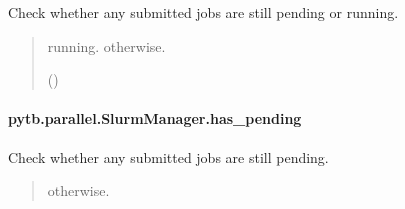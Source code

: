 \documentclass[letterpaper,10pt,english,openany,oneside]{sphinxmanual}
\begin{document}
\begin{fulllineitems}
\begin{fulllineitems}
\label{\detokenize{api/pytb.parallel.SlurmManager.has_active:pytb.parallel.SlurmManager.has_active}}
\pysigstartsignatures
{}
\pysigstopsignatures
\sphinxAtStartPar
Check whether any submitted jobs are still pending or running.
\begin{quote}\begin{description}
\sphinxAtStartPar
\begin{description}
\sphinxAtStartPar
running.  otherwise.

\end{description}


\sphinxAtStartPar
()

\end{description}\end{quote}

\end{fulllineitems}


\sphinxstepscope


\paragraph{pytb.parallel.SlurmManager.has\_pending}
\label{\detokenize{api/pytb.parallel.SlurmManager.has_pending:pytb-parallel-slurmmanager-has-pending}}\label{\detokenize{api/pytb.parallel.SlurmManager.has_pending::doc}}

\begin{fulllineitems}
\label{\detokenize{api/pytb.parallel.SlurmManager.has_pending:pytb.parallel.SlurmManager.has_pending}}
\pysigstartsignatures
{}
\pysigstopsignatures
\sphinxAtStartPar
Check whether any submitted jobs are still pending.
\begin{quote}\begin{description}
\sphinxAtStartPar
\begin{description}
\sphinxAtStartPar
{} otherwise.


\end{description}
\end{description}
\end{quote}
\end{fulllineitems}
\end{fulllineitems}
\end{document}

